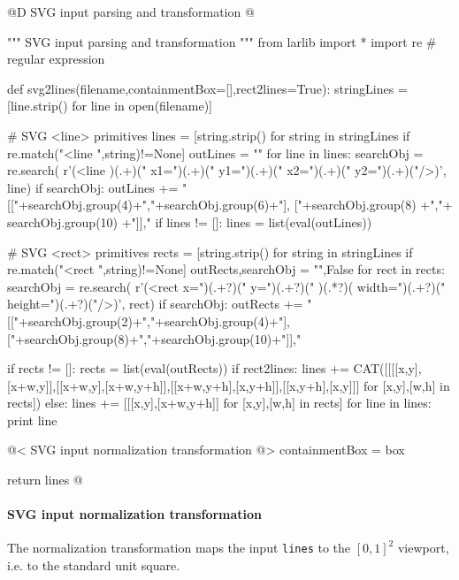 \documentclass[11pt,oneside]{article}    %
\begin{document}
@D SVG input parsing and transformation
@{""" SVG input parsing and transformation """
from larlib import *
import re # regular expression

def svg2lines(filename,containmentBox=[],rect2lines=True):
    stringLines = [line.strip() for line in open(filename)]   
    
    # SVG <line> primitives
    lines = [string.strip() for string in stringLines if re.match("<line ",string)!=None]   
    outLines = ""   
    for line in lines:
        searchObj = re.search( r'(<line )(.+)(" x1=")(.+)(" y1=")(.+)(" x2=")(.+)(" y2=")(.+)("/>)', line)
        if searchObj:
            outLines += "[["+searchObj.group(4)+","+searchObj.group(6)+"], ["+searchObj.group(8) +","+ searchObj.group(10) +"]],"
    if lines != []:
        lines = list(eval(outLines))
              
    # SVG <rect> primitives
    rects = [string.strip() for string in stringLines if re.match("<rect ",string)!=None]   
    outRects,searchObj = "",False 
    for rect in rects:
        searchObj = re.search( r'(<rect x=")(.+?)(" y=")(.+?)(" )(.*?)( width=")(.+?)(" height=")(.+?)("/>)', rect)
        if searchObj:
            outRects += "[["+searchObj.group(2)+","+searchObj.group(4)+"], ["+searchObj.group(8)+","+searchObj.group(10)+"]],"
    
    if rects != []:
        rects = list(eval(outRects))
        if rect2lines:
            lines += CAT([[[[x,y],[x+w,y]],[[x+w,y],[x+w,y+h]],[[x+w,y+h],[x,y+h]],[[x,y+h],[x,y]]] for [x,y],[w,h] in rects])
        else: 
            lines += [[[x,y],[x+w,y+h]] for [x,y],[w,h] in rects]
    for line in lines: print line
    
    @< SVG input normalization transformation @>
    containmentBox = box
    
    return lines
@}
    
    
\paragraph{SVG input normalization transformation}
The normalization transformation maps the input \texttt{lines} to the $[0,1]^2$ viewport, i.e. to the standard unit square.
\end{document}
